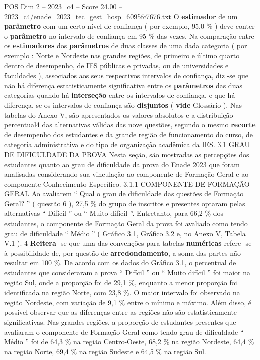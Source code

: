 \begin{textsample}{POS Dim 2 – 2023\_c4 – Score 24.00 – 2023\_c4/enade\_2023\_tec\_gest\_hosp\_6095fc7676.txt}
O \textbf{estimador} de um \textbf{parâmetro} com um certo nível de confiança ( por exemplo, 95,0 \% ) deve conter o \textbf{parâmetro} no intervalo de confiança em 95 \% das vezes.
Na comparação entre os \textbf{estimadores} dos \textbf{parâmetros} de duas classes de uma dada categoria ( por exemplo : Norte e Nordeste nas grandes regiões, de primeiro e último quarto dentro de desempenho, de IES públicas e privadas, ou de universidades e faculdades ), associados aos seus respectivos intervalos de confiança, diz -se que não há diferença estatisticamente significativa entre os \textbf{parâmetros} das duas categorias quando há \textbf{interseção} entre os intervalos de confiança, e que há diferença, se os intervalos de confiança são \textbf{disjuntos} ( \textbf{vide} Glossário ).
Nas tabelas do Anexo V, são apresentados os valores absolutos e a distribuição percentual4 das alternativas válidas das nove questões, segundo o mesmo \textbf{recorte} de desempenho dos estudantes e da grande região de funcionamento do curso, de categoria administrativa e do tipo de organização acadêmica da IES. 3.1 GRAU DE DIFICULDADE DA PROVA Nesta seção, são mostradas as percepções dos estudantes quanto ao grau de dificuldade da prova do Enade 2023 que foram analisadas considerando sua vinculação ao componente de Formação Geral e ao componente Conhecimento Específico. 3.1.1 COMPONENTE DE FORMAÇÃO GERAL Ao avaliarem “ Qual o grau de dificuldade das questões de Formação Geral? ” ( questão 6 ), 27,5 \% do grupo de inscritos e presentes optaram pelas alternativas “ Difícil ” ou “ Muito difícil ”.
Entretanto, para 66,2 \% dos estudantes, o componente de Formação Geral da prova foi avaliado como tendo grau de dificuldade “ Médio ” ( Gráfico 3.1, Gráfico 3.2 e, no Anexo V, Tabela V.1 ). 4 \textbf{Reitera} -se que uma das convenções para tabelas \textbf{numéricas} refere -se à possibilidade de, por questão de \textbf{arredondamento}, a soma das partes não resultar em 100 \%.
De acordo com os dados do Gráfico 3.1, o percentual de estudantes que consideraram a prova “ Difícil ” ou “ Muito difícil ” foi maior na região Sul, onde a proporção foi de 29,1 \%, enquanto a menor proporção foi identificada na região Norte, com 23,8 \%.
O maior intervalo foi observado na região Nordeste, com variação de 9,1 \% entre o mínimo e máximo.
Além disso, é possível observar que as diferenças entre as regiões não são estatisticamente significativas.
Nas grandes regiões, a proporção de estudantes presentes que avaliaram o componente de Formação Geral como tendo grau de dificuldade “ Médio ” foi de 64,3 \% na região Centro-Oeste, 68,2 \% na região Nordeste, 64,4 \% na região Norte, 69,4 \% na região Sudeste e 64,5 \% na região Sul.

\end{textsample}
